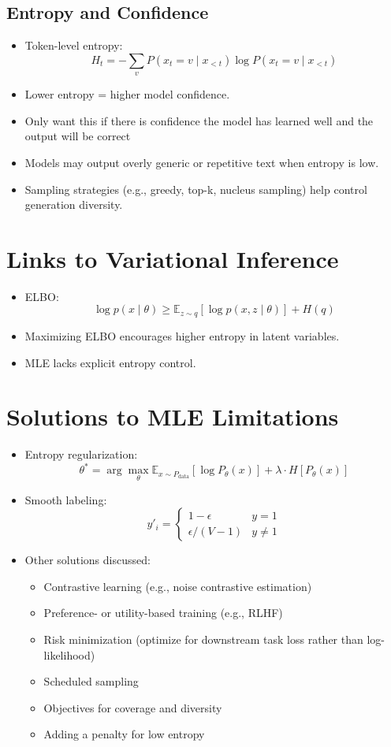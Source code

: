\documentclass[11pt]{article}
\begin{document}
\subsection*{Entropy and Confidence}
\begin{itemize}
    \item Token-level entropy:
    \[ H_t = -\sum_v P(x_t = v \mid x_{<t}) \log P(x_t = v \mid x_{<t}) \]
    \item Lower entropy = higher model confidence.
    \item Only want this if there is confidence the model has learned well and the output will be correct
    \item Models may output overly generic or repetitive text when entropy is low.
    \item Sampling strategies (e.g., greedy, top-k, nucleus sampling) help control generation diversity.
\end{itemize}

\section{Links to Variational Inference}
\begin{itemize}
    \item ELBO:
    \[ \log p(x \mid \theta) \geq \mathbb{E}_{z \sim q}[\log p(x,z \mid \theta)] + H(q) \]
    \item Maximizing ELBO encourages higher entropy in latent variables.
    \item MLE lacks explicit entropy control.
\end{itemize}

\section{Solutions to MLE Limitations}
\begin{itemize}
    \item Entropy regularization:
    \[ \theta^* = \arg\max_{\theta} \mathbb{E}_{x \sim P_{\text{data}}}[\log P_{\theta}(x)] + \lambda \cdot H[P_{\theta}(x)] \]
    \item Smooth labeling:
    \[ y'_i = \begin{cases} 1 - \epsilon & y = 1 \\ \epsilon / (V - 1) & y \neq 1 \end{cases} \]
    \item Other solutions discussed:
    \begin{itemize}
        \item Contrastive learning (e.g., noise contrastive estimation)
        \item Preference- or utility-based training (e.g., RLHF)
        \item Risk minimization (optimize for downstream task loss rather than log-likelihood)
        \item Scheduled sampling
        \item Objectives for coverage and diversity
        \item Adding a penalty for low entropy
    \end{itemize}
\end{itemize}
\end{document}
